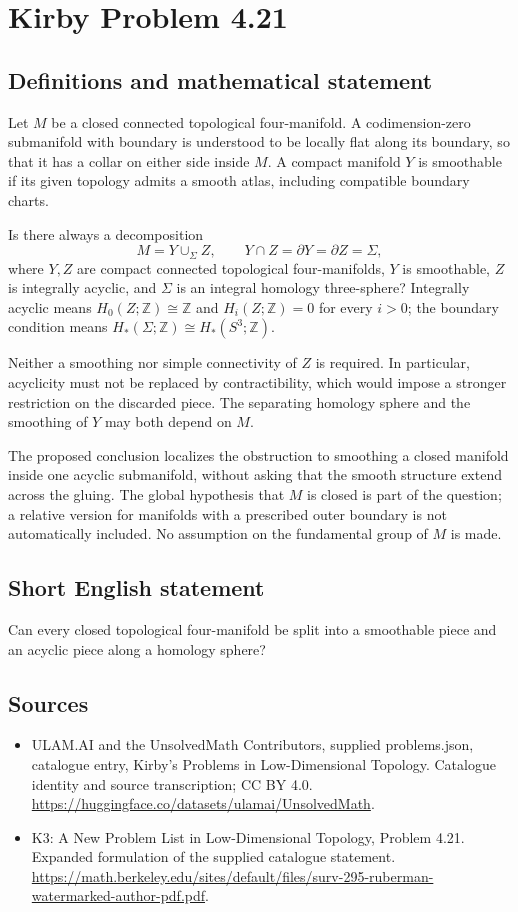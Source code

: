 \documentclass[11pt,a4paper]{article}
\begin{document}
\section*{Kirby Problem 4.21}\label{statement}

\subsection{Definitions and mathematical statement}
Let $M$ be a closed connected topological four-manifold. A codimension-zero submanifold with boundary is understood to be locally flat along its boundary, so that it has a collar on either side inside $M$. A compact manifold $Y$ is smoothable if its given topology admits a smooth atlas, including compatible boundary charts.

Is there always a decomposition
\[
M=Y\cup_\Sigma Z,\qquad
Y\cap Z=\partial Y=\partial Z=\Sigma,
\]
where $Y,Z$ are compact connected topological four-manifolds, $Y$ is smoothable, $Z$ is integrally acyclic, and $\Sigma$ is an integral homology three-sphere? Integrally acyclic means $H_0(Z;\mathbb Z)\cong\mathbb Z$ and $H_i(Z;\mathbb Z)=0$ for every $i>0$; the boundary condition means $H_*(\Sigma;\mathbb Z)\cong H_*(S^3;\mathbb Z)$.

Neither a smoothing nor simple connectivity of $Z$ is required. In particular, acyclicity must not be replaced by contractibility, which would impose a stronger restriction on the discarded piece. The separating homology sphere and the smoothing of $Y$ may both depend on $M$.

The proposed conclusion localizes the obstruction to smoothing a closed manifold inside one acyclic submanifold, without asking that the smooth structure extend across the gluing. The global hypothesis that $M$ is closed is part of the question; a relative version for manifolds with a prescribed outer boundary is not automatically included. No assumption on the fundamental group of $M$ is made.
\subsection{Short English statement}
Can every closed topological four-manifold be split into a smoothable piece and an acyclic piece along a homology sphere?
\subsection{Sources}
\begin{itemize}
\item[S1] ULAM.AI and the UnsolvedMath Contributors, supplied problems.json, catalogue entry, Kirby's Problems in Low-Dimensional Topology. Catalogue identity and source transcription; CC BY 4.0.
\url{https://huggingface.co/datasets/ulamai/UnsolvedMath}.
\item[S2] K3: A New Problem List in Low-Dimensional Topology, Problem 4.21. Expanded formulation of the supplied catalogue statement.
\url{https://math.berkeley.edu/sites/default/files/surv-295-ruberman-watermarked-author-pdf.pdf}.
\end{itemize}
\end{document}
